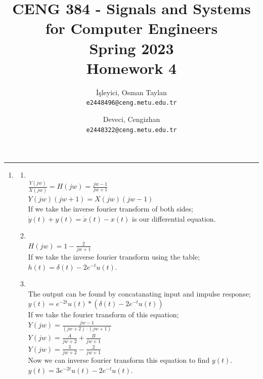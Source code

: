 \documentclass[10pt,a4paper, margin=1in]{article}
\author{
  İşleyici, Osman Taylan\\
  \texttt{e2448496@ceng.metu.edu.tr}
  \and
  Deveci, Cengizhan\\
  \texttt{e2448322@ceng.metu.edu.tr}
}
\title{CENG 384 - Signals and Systems for Computer Engineers \\
Spring 2023 \\
Homework 4}
\begin{document}
\maketitle



\noindent\rule{19cm}{1.2pt}

\begin{enumerate}

    \item %
          \begin{enumerate}
              \item~\\
              $\frac{Y(jw)}{X(jw)} = H(jw) = \frac{jw-1}{jw+1}$\\
              $Y(jw)(jw+1) = X(jw)(jw-1)$\\
              If we take the inverse fourier transform of both sides;\\
              $\dot{y}(t)+y(t) = \dot{x}(t)-x(t)$ is our differential equation.
              \item~\\
              $H(jw) = 1-\frac{2}{jw+1}$\\ If we take the inverse fourier transform using the table;\\
              $h(t) = \delta(t) - 2e^{-t}u(t)$.
              \item~\\
              The output can be found by concatanating input and impulse response;\\
              $y(t) = e^{-2t}u(t)\ast(\delta(t)-2e^{-t}u(t))$\\
              If we take the fourier transform of this equation;\\
              $Y(jw) = \frac{jw-1}{(jw+2)\cdot(jw+1)}$\\
              $Y(jw) = \frac{A}{jw+2}+\frac{B}{jw+1}$\\
              $Y(jw) = \frac{3}{jw+2} - \frac{2}{jw+1}$\\
              Now we can inverse fourier transform this equation to find $y(t)$.\\
              $y(t) = 3e^{-2t}u(t) - 2e^{-t}u(t)$.\\
\end{enumerate}
\end{enumerate}
\end{document}
